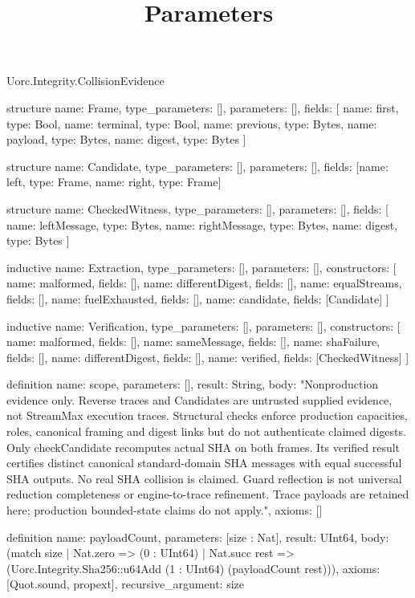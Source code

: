 \begin{lexlean}{Uorc.Integrity.CollisionEvidence}
\title{Parameters}
\begin{semanticmodule}
structure{
  name: Frame,
  type_parameters: [],
  parameters: [],
  fields: [
    {name: first, type: Bool},
    {name: terminal, type: Bool},
    {name: previous, type: Bytes},
    {name: payload, type: Bytes},
    {name: digest, type: Bytes}
  ]
}

structure{
  name: Candidate,
  type_parameters: [],
  parameters: [],
  fields: [{name: left, type: Frame}, {name: right, type: Frame}]
}

structure{
  name: CheckedWitness,
  type_parameters: [],
  parameters: [],
  fields: [
    {name: leftMessage, type: Bytes},
    {name: rightMessage, type: Bytes},
    {name: digest, type: Bytes}
  ]
}

inductive{
  name: Extraction,
  type_parameters: [],
  parameters: [],
  constructors: [
    {name: malformed, fields: []},
    {name: differentDigest, fields: []},
    {name: equalStreams, fields: []},
    {name: fuelExhausted, fields: []},
    {name: candidate, fields: [Candidate]}
  ]
}

inductive{
  name: Verification,
  type_parameters: [],
  parameters: [],
  constructors: [
    {name: malformed, fields: []},
    {name: sameMessage, fields: []},
    {name: shaFailure, fields: []},
    {name: differentDigest, fields: []},
    {name: verified, fields: [CheckedWitness]}
  ]
}

definition{
  name: scope,
  parameters: [],
  result: String,
  body: "Nonproduction evidence only. Reverse traces and Candidates are untrusted supplied evidence, not StreamMax execution traces. Structural checks enforce production capacities, roles, canonical framing and digest links but do not authenticate claimed digests. Only checkCandidate recomputes actual SHA on both frames. Its verified result certifies distinct canonical standard-domain SHA messages with equal successful SHA outputs. No real SHA collision is claimed. Guard reflection is not universal reduction completeness or engine-to-trace refinement. Trace payloads are retained here; production bounded-state claims do not apply.",
  axioms: []
}

definition{
  name: payloadCount,
  parameters: [size : Nat],
  result: UInt64,
  body: (match size
    | Nat.zero => (0 : UInt64)
    | Nat.succ rest => (Uorc.Integrity.Sha256::u64Add (1 : UInt64) (payloadCount rest))),
  axioms: [Quot.sound, propext],
  recursive_argument: size
}


\end{semanticmodule}
\end{lexlean}

